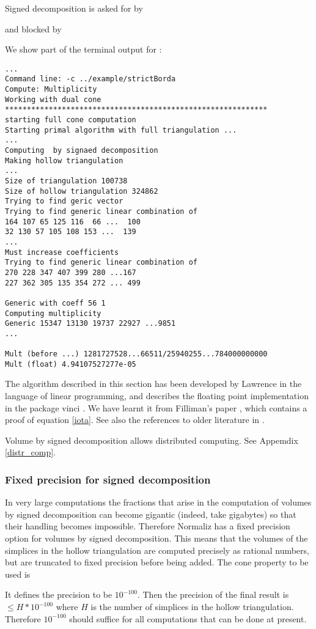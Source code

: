 Signed decomposition is asked for by
\begin{itemize}
	\itemtt[SignedDec]
\end{itemize}
and blocked by
\begin{itemize}
	\itemtt[NoSignedDec]
\end{itemize}

We show part of the terminal output for : 
 \begin{Verbatim}
...
Command line: -c ../example/strictBorda 
Compute: Multiplicity 
Working with dual cone
************************************************************
starting full cone computation
Starting primal algorithm with full triangulation ...
...
Computing  by signaed decomposition
Making hollow triangulation
...
Size of triangulation 100738
Size of hollow triangulation 324862
Trying to find geric vector
Trying to find generic linear combination of 
164 107 65 125 116  66 ...  100
32 130 57 105 108 153 ...  139
...
Must increase coefficients
Trying to find generic linear combination of 
270 228 347 407 399 280 ...167
227 362 305 135 354 272 ... 499

Generic with coeff 56 1
Computing multiplicity
Generic 15347 13130 19737 22927 ...9851 
...

Mult (before ...) 1281727528...66511/25940255...784000000000
Mult (float) 4.94107527277e-05
 \end{Verbatim}
 
 The algorithm described in this section has been developed by Lawrence \cite{Lawrence} in the language of linear programming, and \cite{practical} describes the floating point implementation in  the package vinci \cite{vinci}. We have learnt it from Filliman's paper \cite{Filli}, which contains a proof of equation \eqref{iota}. See also the references to older literature in \cite{Filli}.
 
 Volume by signed decomposition allows distributed computing. See Appemdix \ref{distr_comp}.
 
 \subsubsection{Fixed precision for signed decomposition}\label{FixedPrecision}
 
 In very large computations the fractions that arise in the computation of volumes by signed decomposition can become gigantic (indeed, take gigabytes) so that their handling becomes impossible. Therefore Normaliz has a fixed precision option for volumes by signed decomposition. This means that the volumes of the simplices in the hollow triangulation are computed precisely as rational numbers, but are truncated to fixed precision before being added.
The cone property to be used is
  \begin{itemize}
 	\itemtt[FixedPrecision]
 \end{itemize}
It defines the precision to be $10^{-100}$. Then the precision of the final result is $\le H*10^{-100}$ where $H$ is the number of simplices in the hollow triangulation. Therefore $10^{-100}$ should suffice for all computations that can be done at present.
 
